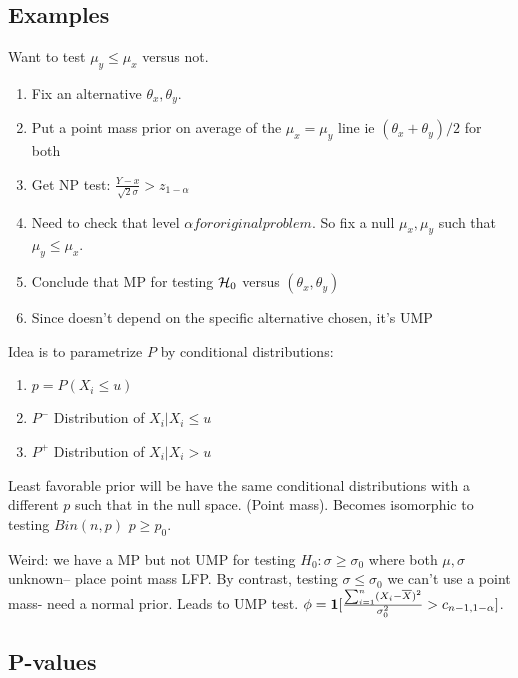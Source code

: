 \documentclass{article}
\begin{document}
\subsection{Examples}

\begin{example}
Want to test $\mu_y\leq \mu_x$ versus not. 
\begin{enumerate}
	\item Fix an alternative $\theta_x, \theta_y$. 
	\item Put a point mass prior on average of the $\mu_x = \mu_y$ line ie $(\theta_x + \theta_y)/2$ for both
	\item Get NP test: $\frac{Y-x}{\sqrt{2} \sigma} > z_{1-\alpha}$
	\item Need to check that level $\alpha for original problem$. So fix a null $\mu_x,\mu_y$ such that $\mu_y\leq \mu_x$. 
	\item Conclude that MP for testing $\mathcal H_0$ versus $(\theta_x, \theta_y)$
	\item Since doesn't depend on the specific alternative chosen, it's UMP
\end{enumerate}
\end{example}
\begin{example}
Idea is to parametrize $P$ by conditional distributions:
\begin{enumerate}
	\item $p = P(X_i \leq u)$
	\item $P^-$ Distribution of $X_i| X_i \leq u$
	\item $P^+$ Distribution of $X_i| X_i > u$
\end{enumerate}
Least favorable prior will be have the same conditional distributions with a different $p$ such that in the null space. (Point mass). Becomes isomorphic to testing $Bin(n,p)$ $p \geq p_0$. 
\end{example}

Weird: we have a MP but not UMP for testing $H_0: \sigma \geq \sigma_0$ where both $\mu,\sigma$ unknown-- place point mass LFP. By contrast, testing $\sigma \leq \sigma_0$ we can't use a point mass- need a normal prior. Leads to UMP test. $\phi = \boldsymbol{1}[\frac{\sum_{i=1}^n (X_i - \overline X)^2 }{\sigma_0^2} > c_{n-1, 1-\alpha}]$. 

\subsection{P-values}
\end{document}
